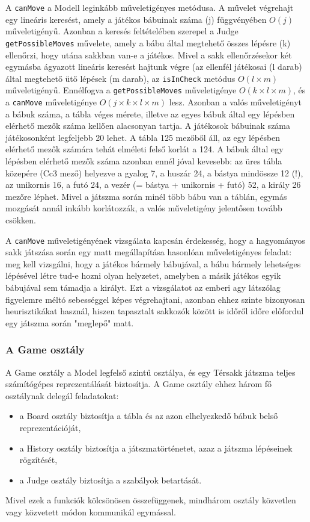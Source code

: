 \documentclass[12pt, twoside]{report}
\begin{document}
\begin{itemize}
	A {\tt canMove} a Modell leginkább műveletigényes metódusa. A művelet végrehajt egy lineáris keresést, amely a játékos bábuinak száma (j) függvényében $O(j)$ műveletigényű. Azonban a keresés feltételében szerepel a Judge {\tt getPossibleMoves} művelete, amely a bábu által megtehető összes lépésre (k) ellenőrzi, hogy utána sakkban van-e a játékos. Mivel a sakk ellenőrzésekor két egymásba ágyazott lineáris keresést hajtunk végre (az ellenfél játékosai (l darab) által megtehető ütő lépések (m darab), az {\tt isInCheck} metódus $O(l \times m)$ műveletigényű. Ennélfogva a {\tt getPossibleMoves} műveletigénye $O(k \times l \times m)$, és a {\tt canMove} műveletigénye $O(j \times k \times l \times m)$ lesz. Azonban a valós műveletigényt a bábuk száma, a tábla véges mérete, illetve az egyes bábuk által egy lépésben elérhető mezők száma kellően alacsonyan tartja. A játékosok bábuinak száma játékosonként legfeljebb 20 lehet. A tábla 125 mezőből áll, az egy lépésben elérhető mezők számára tehát elméleti felső korlát a 124. A bábuk által egy lépésben elérhető mezők száma azonban ennél jóval kevesebb: az üres tábla közepére (Cc3 mező) helyezve a gyalog 7, a huszár 24, a bástya mindössze 12 (!), az unikornis 16, a futó 24, a vezér (= bástya + unikornis + futó) 52, a király 26 mezőre léphet. Mivel a játszma során minél több bábu van a táblán, egymás mozgását annál inkább korlátozzák, a valós műveletigény jelentősen tovább csökken. 
	
	A {\tt canMove} műveletigényének vizsgálata kapcsán érdekesség, hogy a hagyományos sakk játszása során egy matt megállapítása hasonlóan műveletigényes feladat: meg kell vizsgálni, hogy a játékos bármely bábujával, a bábu bármely lehetséges lépésével létre tud-e hozni olyan helyzetet, amelyben a másik játékos egyik bábujával sem támadja a királyt. Ezt a vizsgálatot az emberi agy látszólag figyelemre méltó sebességgel képes végrehajtani, azonban ehhez szinte bizonyosan heurisztikákat használ, hiszen tapasztalt sakkozók között is időről időre előfordul egy játszma során "meglepő" matt.
\end{itemize}

\subsubsection{A Game osztály}

A Game osztály a Model legfelső szintű osztálya, és egy Térsakk játszma teljes számítógépes reprezentálását biztosítja. A Game osztály ehhez három fő osztálynak delegál feladatokat:
\begin{itemize}
	\item a Board osztály biztosítja a tábla és az azon elhelyezkedő bábuk belső reprezentációját,
	\item a History osztály biztosítja a játszmatörténetet, azaz a játszma lépéseinek rögzítését,
	\item a Judge osztály biztosítja a szabályok betartását.
\end{itemize}
Mivel ezek a funkciók kölcsönösen összefüggenek, mindhárom osztály közvetlen vagy közvetett módon kommunikál egymással.
\end{document}
